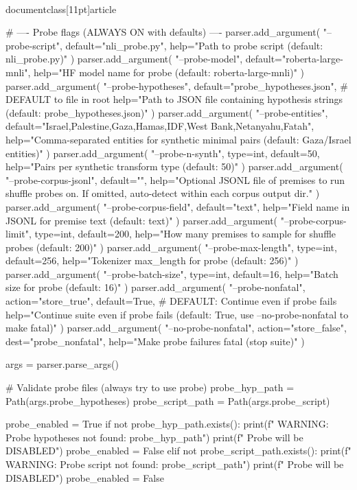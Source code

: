 \\documentclass[11pt]{article}
\begin{document}
\begin{CodeBlock}
    # ---- Probe flags (ALWAYS ON with defaults) ----
    parser.add_argument(
        "--probe-script",
        default="nli_probe.py",
        help="Path to probe script (default: nli_probe.py)"
    )
    parser.add_argument(
        "--probe-model",
        default="roberta-large-mnli",
        help="HF model name for probe (default: roberta-large-mnli)"
    )
    parser.add_argument(
        "--probe-hypotheses",
        default="probe_hypotheses.json",  # DEFAULT to file in root
        help="Path to JSON file containing hypothesis strings (default: probe_hypotheses.json)"
    )
    parser.add_argument(
        "--probe-entities",
        default="Israel,Palestine,Gaza,Hamas,IDF,West Bank,Netanyahu,Fatah",
        help="Comma-separated entities for synthetic minimal pairs (default: Gaza/Israel entities)"
    )
    parser.add_argument(
        "--probe-n-synth",
        type=int,
        default=50,
        help="Pairs per synthetic transform type (default: 50)"
    )
    parser.add_argument(
        "--probe-corpus-jsonl",
        default="",
        help="Optional JSONL file of premises to run shuffle probes on. If omitted, auto-detect within each corpus output dir."
    )
    parser.add_argument(
        "--probe-corpus-field",
        default="text",
        help="Field name in JSONL for premise text (default: text)"
    )
    parser.add_argument(
        "--probe-corpus-limit",
        type=int,
        default=200,
        help="How many premises to sample for shuffle probes (default: 200)"
    )
    parser.add_argument(
        "--probe-max-length",
        type=int,
        default=256,
        help="Tokenizer max_length for probe (default: 256)"
    )
    parser.add_argument(
        "--probe-batch-size",
        type=int,
        default=16,
        help="Batch size for probe (default: 16)"
    )
    parser.add_argument(
        "--probe-nonfatal",
        action="store_true",
        default=True,  # DEFAULT: Continue even if probe fails
        help="Continue suite even if probe fails (default: True, use --no-probe-nonfatal to make fatal)"
    )
    parser.add_argument(
        "--no-probe-nonfatal",
        action="store_false",
        dest="probe_nonfatal",
        help="Make probe failures fatal (stop suite)"
    )

    args = parser.parse_args()

    # Validate probe files (always try to use probe)
    probe_hyp_path = Path(args.probe_hypotheses)
    probe_script_path = Path(args.probe_script)
    
    probe_enabled = True
    if not probe_hyp_path.exists():
        print(f"  WARNING: Probe hypotheses not found: {probe_hyp_path}")
        print(f"  Probe will be DISABLED")
        probe_enabled = False
    elif not probe_script_path.exists():
        print(f"  WARNING: Probe script not found: {probe_script_path}")
        print(f"  Probe will be DISABLED")
        probe_enabled = False


\end{CodeBlock}
\end{document}
